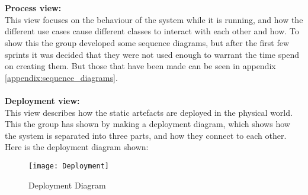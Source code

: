 \\
\\
\textbf{Process view:}
\\
This view focuses on the behaviour of the system while it is running, and
how the different use cases cause different classes to interact with each
other and how. To show this the group developed some sequence diagrams, but
 after the first few sprints it was decided that they were not used enough
 to warrant the time spend on creating them. But those that have been made can be seen in appendix \ref{appendix:sequence_diagrams}.
\\
\\
\textbf{Deployment view:}
\\
This view describes how the static artefacts are deployed in the physical
world. This the group has shown by making a deployment diagram, which shows
how the system is separated into three parts, and how they connect to each
other. Here is the deployment diagram shown:\\
\begin{figure}[h]
\centerline{\texttt{[image: Deployment]} }
\caption{Deployment Diagram}
\end{figure}
